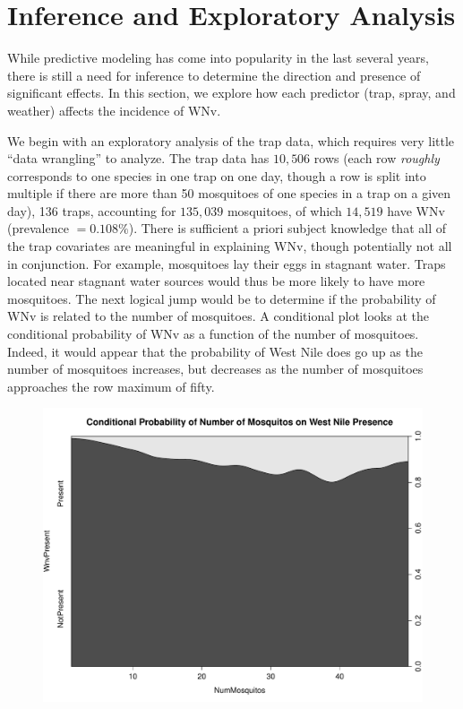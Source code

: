 \documentclass[12pt]{article}
\begin{document}
\section{Inference and Exploratory Analysis}
While predictive modeling has come into popularity in the last several years, there is still a need for inference to determine the direction and presence of significant effects. In this section, we explore how each predictor (trap, spray, and weather) affects the incidence of WNv.

We begin with an exploratory analysis of the trap data, which requires very little ``data wrangling'' to analyze. The trap data has $10,506$ rows (each row \emph{roughly} corresponds to one species in one trap on one day, though a row is split into multiple if there are more than 50 mosquitoes of one species in a trap on a given day), 136 traps, accounting for $135,039$ mosquitoes, of which $14,519$ have WNv (prevalence $= 0.108\%$). There is sufficient a priori subject knowledge that all of the trap covariates are meaningful in explaining WNv, though potentially not all in conjunction. For example, mosquitoes lay their eggs in stagnant water. Traps located near stagnant water sources would thus be more likely to have more mosquitoes. The next logical jump would be to determine if the probability of WNv is related to the number of mosquitoes. A conditional plot looks at the conditional probability of WNv as a function of the number of mosquitoes. Indeed, it would appear that the probability of West Nile does go up as the number of mosquitoes increases, but decreases as the number of mosquitoes approaches the row maximum of fifty.
\begin{figure}[H] \center
\includegraphics[scale=.30]{CD_NumMos_WNv.pdf}
\end{figure}
\end{document}

